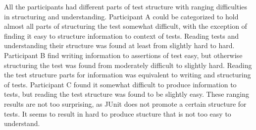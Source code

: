 All the participants had different parts of test
structure with ranging difficulties in structuring and understanding. Participant A could be categorized to hold almost all
parts of structuring the test somewhat difficult, with the exception of finding it easy to structure information to context of tests.
Reading tests and understanding their structure was found at least from slightly hard to hard.
Participant B find writing information to assertions of test easy, but otherwise structuring the test
was found from moderately difficult to slightly hard. Reading the test structure parts for information was equivalent
to writing and structuring of tests. Participant C found it somewhat difficult to produce information
to tests, but reading the test structure was found to be slightly easy. These ranging results are not too surprising,
as JUnit does not promote a certain structure for tests. It seems to result in hard to produce stucture that is not
too easy to understand.

